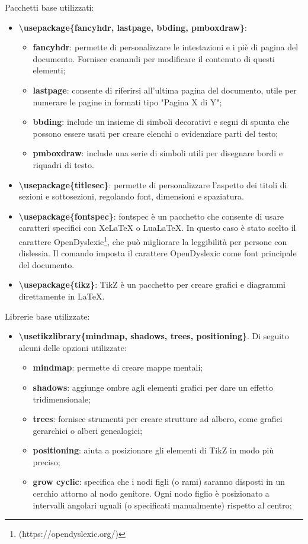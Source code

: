 \documentclass[portrait,a4paper]{article} %
\begin{document}
\par
\noindent
Pacchetti base utilizzati:
\begin{itemize}
    \item \textbf{\textbackslash usepackage\{fancyhdr, lastpage, bbding, pmboxdraw\}}:
        \begin{itemize}
            \item \textbf{fancyhdr}: permette di personalizzare le intestazioni e i piè di pagina del documento. Fornisce comandi per modificare il contenuto di questi elementi;
            \item \textbf{lastpage}: consente di riferirsi all'ultima pagina del documento, utile per numerare le pagine in formati tipo "Pagina X di Y";
            \item \textbf{bbding}: include un insieme di simboli decorativi e segni di spunta che possono essere usati per creare elenchi o evidenziare parti del testo;
            \item \textbf{pmboxdraw}: include una serie di simboli utili per disegnare bordi e riquadri di testo.
        \end{itemize}
    \item \textbf{\textbackslash usepackage\{titlesec\}}: permette di personalizzare l’aspetto dei titoli di sezioni e sottosezioni, regolando font, dimensioni e spaziatura.
    \item \textbf{\textbackslash usepackage\{fontspec\}}: fontspec è un pacchetto che consente di usare caratteri specifici con XeLaTeX o LuaLaTeX. In questo caso è stato scelto il carattere OpenDyslexic\footnote{ (https://opendyslexic.org/)}, che può migliorare la leggibilità per persone con dislessia. Il comando \setmainfont{OpenDyslexic} imposta il carattere OpenDyslexic come font principale del documento.
    \item \textbf{\textbackslash usepackage\{tikz\}}: TikZ è un pacchetto per creare grafici e diagrammi direttamente in LaTeX.
\end{itemize}
\par
\noindent
Librerie base utilizzate:
\begin{itemize}
    \item \textbf{\textbackslash usetikzlibrary\{mindmap, shadows, trees, positioning\}}. Di seguito alcuni delle opzioni utilizzate:
        \begin{itemize}
            \item \textbf{mindmap}: permette di creare mappe mentali;
            \item \textbf{shadows}: aggiunge ombre agli elementi grafici per dare un effetto tridimensionale;
            \item \textbf{trees}: fornisce strumenti per creare strutture ad albero, come grafici gerarchici o alberi genealogici;
            \item \textbf{positioning}: aiuta a posizionare gli elementi di TikZ in modo più preciso;
            \item \textbf{grow cyclic}: specifica che i nodi figli (o rami) saranno disposti in un cerchio attorno al nodo genitore. Ogni nodo figlio è posizionato a intervalli angolari uguali (o specificati manualmente) rispetto al centro;
        \end{itemize}
\end{itemize}
\end{document}
